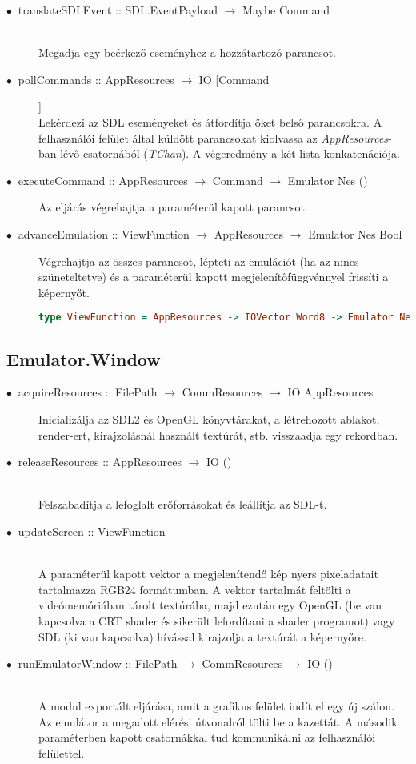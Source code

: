 \begin{description}
	\item[$\bullet\:$ translateSDLEvent :: SDL.EventPayload $\rightarrow$ Maybe Command] \hfill \\
	Megadja egy beérkező eseményhez a hozzátartozó parancsot.
	\item[$\bullet\:$ pollCommands :: AppResources $\rightarrow$ IO [Command]] \hfill \\
	Lekérdezi az SDL eseményeket és átfordítja őket belső parancsokra. A felhasználói felület által küldött parancsokat kiolvassa az \emph{AppResources}-ban lévő csatornából (\emph{TChan}). A végeredmény a két lista konkatenációja. 
	\item[$\bullet\:$ executeCommand :: AppResources $\rightarrow$ Command $\rightarrow$ Emulator Nes ()] \hfill
	Az eljárás végrehajtja a paraméterül kapott parancsot.
	\item[$\bullet\:$ advanceEmulation :: ViewFunction $\rightarrow$ AppResources $\rightarrow$ Emulator Nes Bool] \hfill
	Végrehajtja az összes parancsot, lépteti az emulációt (ha az nincs szüneteltetve) és a paraméterül kapott megjelenítőfüggvénnyel frissíti a képernyőt.
	\begin{lstlisting}[language=Haskell, basicstyle=\scriptsize]
	type ViewFunction = AppResources -> IOVector Word8 -> Emulator Nes ()
	\end{lstlisting}
\end{description}

\subsection{Emulator.Window}

\begin{description}
	\item[$\bullet\:$ acquireResources :: FilePath $\rightarrow$ CommResources $\rightarrow$ IO AppResources] \hfill Inicializálja az SDL2 és OpenGL könyvtárakat, a létrehozott ablakot, render-ert, kirajzolásnál használt textúrát, stb. visszaadja egy rekordban.
	\item[$\bullet\:$ releaseResources :: AppResources $\rightarrow$ IO ()] \hfill \\
	Felszabadítja a lefoglalt erőforrásokat és leállítja az SDL-t.
	\item[$\bullet\:$ updateScreen :: ViewFunction] \hfill \\
	A paraméterül kapott vektor a megjelenítendő kép nyers pixeladatait tartalmazza RGB24 formátumban. A vektor tartalmát feltölti a videómemóriában tárolt textúrába, majd ezután egy OpenGL (be van kapcsolva a CRT shader és sikerült lefordítani a shader programot) vagy SDL (ki van kapcsolva) hívással kirajzolja a textúrát a képernyőre.
	\item[$\bullet\:$ runEmulatorWindow :: FilePath $\rightarrow$ CommResources $\rightarrow$ IO ()] \hfill \\
	A modul exportált eljárása, amit a grafikus felület indít el egy új szálon. Az emulátor a megadott elérési útvonalról tölti be a kazettát. A második paraméterben kapott csatornákkal tud kommunikálni az felhasználói felülettel.
\end{description}


